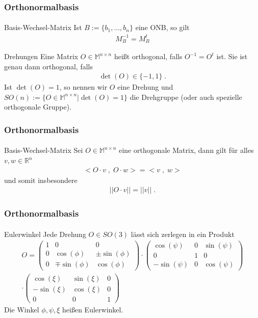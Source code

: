 \documentclass{beamer}
\begin{document}
\begin{frame}
    \frametitle{Orthonormalbasis}
\framesubtitle{}
\begin{block}{Basis-Wechsel-Matrix}
Ist  $B:= \{ b_1, \hdots , b_n \}$  eine ONB, so gilt
\begin{align*}
M_{B}^{-1} = M_{B}^t
\end{align*}
\end{block}
\begin{block}{Drehungen}
Eine Matrix $O \in \mathbb{M}^{n \times n}$ heißt orthogonal, falls
$O^{-1} = O^t$ ist.  Sie ist genau dann  orthogonal, falls
\begin{align*}
\det(O) \in  \{-1, 1 \} \; .
\end{align*}
Ist $\det(O) = 1$, so nennen wir $O$ eine Drehung und 
$SO(n) := \{ O \in \mathbb{M}^{n \times n} | \det(O) = 1\}$ die Drehgruppe (oder auch spezielle orthogonale Gruppe).
\end{block}

\end{frame}


\begin{frame}
    \frametitle{Orthonormalbasis}
\framesubtitle{}
\begin{block}{Basis-Wechsel-Matrix}
Sei $O \in \mathbb{M}^{n \times n}$ eine orthogonale Matrix, dann gilt für alles $v,w \in \mathbb{R}^n$
\begin{align*}
< O \cdot v \; , \;  O \cdot w > = <v \; , \; w>
\end{align*}
und somit insbesondere 
\begin{align*}
|| O \cdot v|| = ||v|| \; .
\end{align*}
\end{block}

\end{frame}


\begin{frame}
    \frametitle{Orthonormalbasis}
\framesubtitle{}
\begin{block}{Eulerwinkel}
Jede Drehung  $O \in SO(3)$  lässt sich zerlegen in ein Produkt
\begin{align*}
O = 
\begin{pmatrix}
1 & 0 & 0 \\
0 & \cos(\phi) & \pm \sin(\phi) \\ 
 0 & \mp \sin(\phi) & \cos(\phi)
\end{pmatrix}
\cdot
\begin{pmatrix}
 \cos(\psi) & 0 &   \sin(\psi) \\ 
0 & 1 & 0 \\ 
- \sin(\psi) & 0& \cos(\psi)
\end{pmatrix} \\
\cdot \begin{pmatrix}
 \cos(\xi) &  \sin(\xi)  & 0\\ 
 - \sin(\xi) & \cos(\xi) & 0 \\
0 & 0 & 1 
\end{pmatrix} 
\end{align*} 
Die Winkel $\phi, \psi, \xi$ heißen  Eulerwinkel. 
\end{block}

\end{frame}
\end{document}
